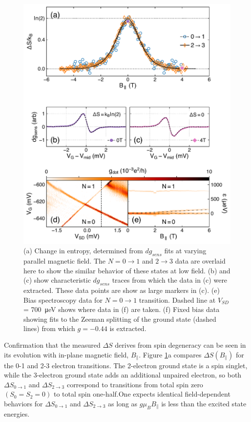 \documentclass[twocolumn,showpacs,preprintnumbers,amsmath,amssymb,pra,aps,superscriptaddress]{revtex4-1}
\begin{document}
\begin{figure}
        \includegraphics[width=1.0\columnwidth]{../figures/figure_3.pdf}
        \caption{\label{fig:fig3}(a) Change in entropy, determined from $dg_{sens}$ fits at varying parallel magnetic field. The $N=0 \rightarrow 1$ and $2 \rightarrow 3$ data are overlaid here to show the similar behavior of these states at low field. (b) and (c) show characteristic $dg_{sens}$ traces from which the data in (c) were extracted. These data points are show as large markers in (c). (e) Bias spectroscopy data for $N=0 \rightarrow 1$ transition. Dashed line at $V_{SD}$ = \SI{700}{\micro\electronvolt} shows where data in (f) are taken. (f) Fixed bias data showing fits to the Zeeman splitting of the ground state (dashed lines) from which $g = -0.44$ is extracted.}
\end{figure}

Confirmation that the measured $\Delta S$ derives from spin degeneracy can be seen in its evolution with in-plane magnetic field, $B_\parallel$. Figure \ref{fig:fig3}a compares $\Delta S(B_\parallel)$ for the 0-1 and 2-3 electron transitions.  The 2-electron ground state is a spin singlet, while the 3-electron ground state adds an additional unpaired electron, so both $\Delta S_{0 \rightarrow 1}$ and $\Delta S_{2 \rightarrow 3}$ correspond to transitions from total spin zero $(S_0=S_2=0)$ to total spin one-half.One expects identical field-dependent behaviors for $\Delta S_{0\rightarrow 1}$ and $\Delta S_{2\rightarrow 3}$ as long as $g \mu_{B} B_\parallel$ is less than the excited state energies.
\end{document}
